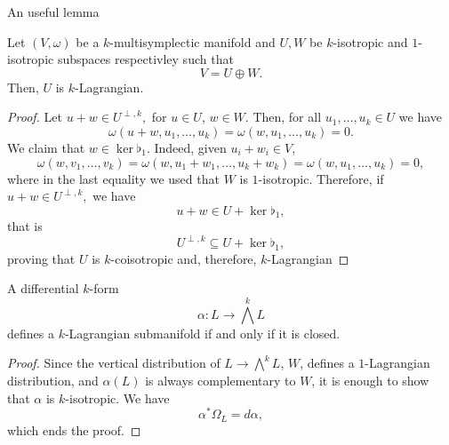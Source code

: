 \begin{frame}{An useful lemma}
\begin{lemma} Let $(V, \omega)$ be a $k$-multisymplectic manifold and $U, W$ be $k$-isotropic and $1$-isotropic subspaces respectivley such that $$V = U \oplus W.$$ Then, $U$ is $k$-Lagrangian.
\end{lemma}
\begin{proof} Let $u + w \in U^{\perp, k},$ for $u \in U$, $w \in W$. Then, for all $u_1, \dots, u_k \in U$ we have $$\omega(u + w, u_1, \dots, u_k) = \omega(w, u_1, \dots, u_k) = 0.$$ We claim that $w \in \ker \flat_1.$ \pause Indeed, given $u_i + w_i \in V$, $$\omega(w, v_1, \dots, v_k) = \omega(w, u_1 + w_1, \dots, u_k +w_k) = \omega(w, u_1, \dots, u_k) = 0,$$ where in the last equality we used that $W$ is $1$-isotropic. Therefore, if $u + w \in U^{\perp, k},$ we have $$u + w \in U +\ker \flat_1,$$ that is $$U^{\perp, k} \subseteq U + \ker \flat_1,$$ proving that $U$ is $k$-coisotropic and, therefore, $k$-Lagrangian
\end{proof}
\end{frame}

\begin{frame}
\begin{proposition}
        A differential $k$-form $$\alpha: L \rightarrow \bigwedge^k L$$ defines a $k$-Lagrangian submanifold if and only if it is closed.
\end{proposition}
\begin{proof} Since the vertical distribution of $L \rightarrow \bigwedge^k L$, $W$, defines a $1$-Lagrangian distribution, and $\alpha(L)$ is always complementary to $W$, it is enough to show that $\alpha$ is $k$-isotropic. We have $$\alpha^\ast \Omega_L = d \alpha,$$ which ends the proof.
\end{proof}
\end{frame}
